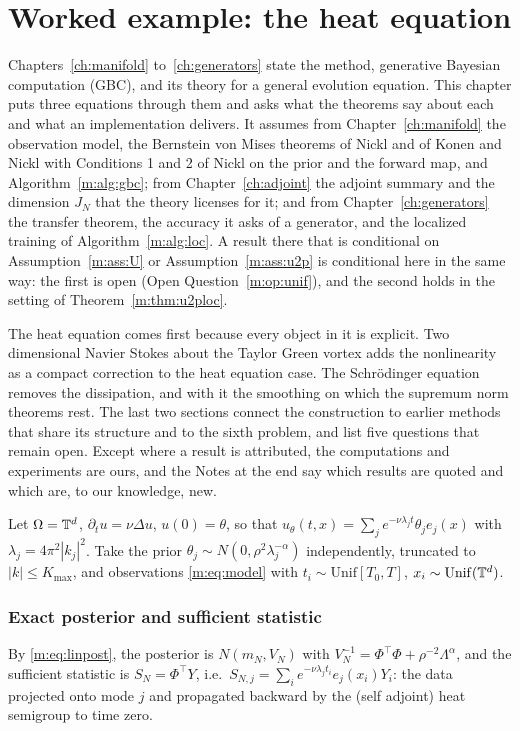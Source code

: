 \section{Worked example: the heat equation}\label{m:sec:heat}

Chapters~\ref{ch:manifold} to~\ref{ch:generators} state the method, generative Bayesian computation (GBC), and its theory for a general evolution equation. This chapter puts three equations through them and asks what the theorems say about each and what an implementation delivers. It assumes from Chapter~\ref{ch:manifold} the observation model, the Bernstein von Mises theorems of Nickl and of Konen and Nickl with Conditions 1 and 2 of Nickl on the prior and the forward map, and Algorithm~\ref{m:alg:gbc}; from Chapter~\ref{ch:adjoint} the adjoint summary and the dimension $J_N$ that the theory licenses for it; and from Chapter~\ref{ch:generators} the transfer theorem, the accuracy it asks of a generator, and the localized training of Algorithm~\ref{m:alg:loc}. A result there that is conditional on Assumption~\ref{m:ass:U} or Assumption~\ref{m:ass:u2p} is conditional here in the same way: the first is open (Open Question~\ref{m:op:unif}), and the second holds in the setting of Theorem~\ref{m:thm:u2ploc}.

The heat equation comes first because every object in it is explicit. Two dimensional Navier Stokes about the Taylor Green vortex adds the nonlinearity as a compact correction to the heat equation case. The Schr\"odinger equation removes the dissipation, and with it the smoothing on which the supremum norm theorems rest. The last two sections connect the construction to earlier methods that share its structure and to the sixth problem, and list five questions that remain open. Except where a result is attributed, the computations and experiments are ours, and the Notes at the end say which results are quoted and which are, to our knowledge, new.

Let $\Omega=\mathbb{T}^d$, $\partial_tu=\nu\Delta u$, $u(0)=\theta$, so that $u_\theta(t,x)=\sum_j e^{-\nu\lambda_jt}\theta_je_j(x)$ with $\lambda_j=4\pi^2|k_j|^2$. Take the prior $\theta_j\sim N(0,\rho^2\lambda_j^{-\alpha})$ independently, truncated to $|k|\le K_{\max}$, and observations \eqref{m:eq:model} with $t_i\sim\mathrm{Unif}[T_0,T]$, $x_i\sim\mathrm{Unif}(\mathbb{T}^d)$.

\subsubsection{Exact posterior and sufficient statistic} By \eqref{m:eq:linpost}, the posterior is $N(m_N,V_N)$ with $V_N^{-1}=\Phi^\top\Phi+\rho^{-2}\Lambda^\alpha$, and the sufficient statistic is $S_N=\Phi^\top Y$, i.e.\ $S_{N,j}=\sum_ie^{-\nu\lambda_jt_i}e_j(x_i)Y_i$: the data projected onto mode $j$ and propagated backward by the (self adjoint) heat semigroup to time zero.

